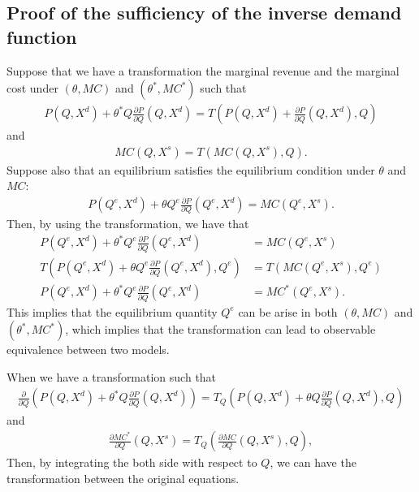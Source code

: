 \documentclass[11pt, a4paper]{article}
\theoremstyle{remark}
\begin{document}
\subsection{Proof of the sufficiency of the inverse demand function}
Suppose that we have a transformation the marginal revenue and the marginal cost under $(\theta, MC)$ and $(\theta^{*}, MC^{*})$ such that
\begin{align}
    P(Q, X^{d}) + \theta^{*} Q \frac{\partial P}{\partial Q}(Q, X^{d}) = T\left(P(Q, X^{d}) + \frac{\partial P}{\partial Q}(Q, X^{d}), Q\right)
\end{align}
and
\begin{align}
    MC(Q, X^{s}) = T\left(MC(Q, X^{s}), Q\right).
\end{align}
Suppose also that an equilibrium satisfies the equilibrium condition under $\theta$ and $MC$:
\begin{align}
    P(Q^e, X^{d}) + \theta Q^e \frac{\partial P}{\partial Q}(Q^e, X^{d}) = MC(Q^e, X^{s}).
\end{align}
Then, by using the transformation, we have that
\begin{align}
    P(Q^e, X^{d}) + \theta^{*} Q^e \frac{\partial P}{\partial Q}(Q^e, X^{d}) & = MC(Q^e, X^{s})\\
    T\left(P(Q^e, X^{d}) + \theta Q^e \frac{\partial P}{\partial Q}(Q^e, X^{d}), Q^e\right)&= T\left(MC(Q^e, X^{s}), Q^e\right)\\
    P(Q^e, X^{d}) + \theta^{*} Q^e \frac{\partial P}{\partial Q}(Q^e, X^{d})&= MC^{*}(Q^e, X^{s}).
\end{align}
This implies that the equilibrium quantity $Q^e$ can be arise in both $(\theta, MC)$ and $(\theta^{*}, MC^{*})$, which implies that the transformation can lead to observable equivalence between two models.


When we have a transformation such that
\begin{align}
    \frac{\partial }{\partial Q}\left( P(Q, X^{d}) + \theta^{*} Q \frac{\partial P}{\partial Q}(Q, X^{d})\right) = T_Q\left(P(Q, X^{d}) + \theta Q \frac{\partial P}{\partial Q}(Q, X^{d}), Q\right)
\end{align}
and
\begin{align}
    \frac{\partial MC^{*} }{\partial Q}(Q, X^{s}) = T_Q\left(\frac{\partial MC}{\partial Q}(Q, X^{s}), Q\right),
\end{align}
Then, by integrating the both side with respect to $Q$, we can have the transformation between the original equations.
\end{document}
